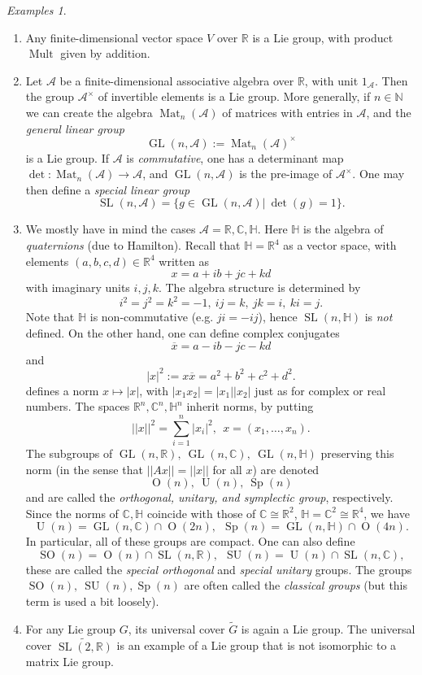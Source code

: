 \documentclass{article}
\theoremstyle{remark}
\newtheorem{examples}[theorem]{Examples}
\newcommand\A{\mathcal{A}}
\newcommand{\U}{\on{U}}
\newcommand{\N}{\mathbb{N}}
\newcommand{\R}{\mathbb{R}}
\newcommand{\C}{\mathbb{C}}
\newcommand{\on}{\operatorname}
\newcommand{\SU}{ \on{SU}}
\newcommand{\GL}{ \on{GL}}
\newcommand{\SL}{ \on{SL}}
\newcommand{\SO}{ \on{SO}}
\newcommand{\ol}{\overline}
\renewcommand{\H}{\mathbb{H}}
\newcommand{\wt}{\widetilde}
\begin{document}
\begin{examples}
\begin{enumerate}
\item Any finite-dimensional vector space $V$ over $\R$ is a Lie group, with product $\on{Mult}$ given by addition. 
\item 
Let $\A$ be a finite-dimensional associative algebra over $\R$, with
unit $1_\A$. Then the group $\A^\times$ of invertible elements is a
Lie group. More generally, if $n\in\N$ we can create the algebra
$\on{Mat}_n(\A)$ of matrices with entries in $\A$, and the
\emph{general linear group}
%
\[ \GL(n,\A):=\on{Mat}_n(\A)^\times\]
%
is a Lie group. If $\A$ is \emph{commutative}, one has a determinant map  
$\on{det}\colon \on{Mat}_n(\A)\to \A$, and $\GL(n,\A)$ is the pre-image of $\A^\times$. One may then define a \emph{special linear group}
\[ \on{SL}(n,\A)=\{g\in \GL(n,\A)|\ \det(g)=1\}.\]
\item 
We mostly have in mind the cases $\A=\R,\C,\H$. Here $\H$ is the algebra of 
\emph{quaternions} (due to Hamilton). Recall that $\H=\R^4$ as a vector space, with elements 
$(a,b,c,d)\in \R^4$ written as 
%
\[ x=a+ib+jc+kd\]
%
with imaginary units $i,j,k$. The algebra structure is determined by 
\[ i^2=j^2=k^2=-1,\ ij=k,\ jk=i,\ ki=j.\]
%
Note that $\H$ is non-commutative (e.g. $ji=-ij$), hence $\on{SL}(n,\H)$ is 
\emph{not} defined. On the other hand, one can define complex conjugates
\[ \ol{x}=a-ib-jc-kd\]
and 
\[ |x|^2:=x\ol{x}=a^2+b^2+c^2+d^2.\]
defines a norm $x\mapsto |x|$, with $|x_1x_2|=|x_1| |x_2|$ just as for 
complex or real numbers. The spaces $\R^n,\C^n,\H^n$ inherit norms, 
by putting 
\[ ||x||^2=\sum_{i=1}^n |x_i|^2,\ \ x=(x_1,\ldots,x_n).\]
%
The subgroups of $\GL(n,\R),\ \GL(n,\C),\ \GL(n,\H)$ preserving this 
norm (in the sense that $||Ax||=||x||$ for all $x$) are denoted
%
\[ \on{O}(n),\ \on{U}(n),\ \on{Sp}(n)\]
%
and are called the \emph{orthogonal, unitary, and symplectic group}, 
respectively.  Since the norms of $\C,\H$ coincide with those of 
$\C\cong \R^2$, $\H=\C^2 \cong \R^4$,  we have 
\[ \U(n)=\GL(n,\C)\cap \on{O}(2n),\ \ 
\on{Sp}(n)=\GL(n,\H)\cap \on{O}(4n).\]
%
In particular, all of these groups are compact.  
One can also define 
%
\[ \SO(n)=\on{O}(n)\cap \SL(n,\R),\ \ \SU(n)=\on{U}(n)\cap \SL(n,\C),\]
% 
these are called the \emph{special orthogonal} and \emph{special unitary}
groups. The groups $\SO(n),\ \SU(n), \on{Sp}(n)$ are often called the 
\emph{classical groups} (but this term is used a bit loosely). 
\item 
For any Lie group $G$, its universal cover $\wt{G}$ is again a Lie group. 
The universal cover $\wt{\SL(2,\R)}$ is an example of a Lie group that is not 
isomorphic to a matrix Lie group. 
\end{enumerate}
\end{examples}
\end{document}
